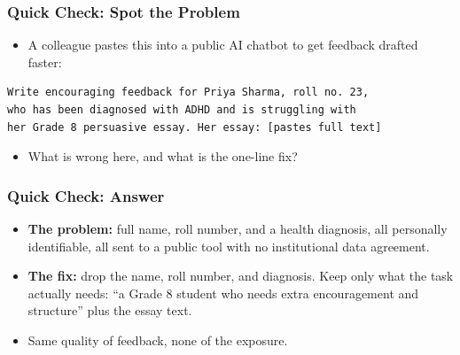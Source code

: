\begin{frame}[fragile]\frametitle{Quick Check: Spot the Problem}
\begin{itemize}
\item A colleague pastes this into a public AI chatbot to get feedback drafted faster:
\end{itemize}
\begin{lstlisting}[language=HTML]
Write encouraging feedback for Priya Sharma, roll no. 23,
who has been diagnosed with ADHD and is struggling with
her Grade 8 persuasive essay. Her essay: [pastes full text]
\end{lstlisting}
\vspace{15pt}
\begin{itemize}
\item What is wrong here, and what is the one-line fix?
\end{itemize}
\end{frame}

\begin{frame}[fragile]\frametitle{Quick Check: Answer}
\begin{itemize}
\item \textbf{The problem:} full name, roll number, and a health diagnosis, all personally identifiable, all sent to a public tool with no institutional data agreement.
\item \textbf{The fix:} drop the name, roll number, and diagnosis. Keep only what the task actually needs: ``a Grade 8 student who needs extra encouragement and structure'' plus the essay text.
\item Same quality of feedback, none of the exposure.
\end{itemize}
\end{frame}
